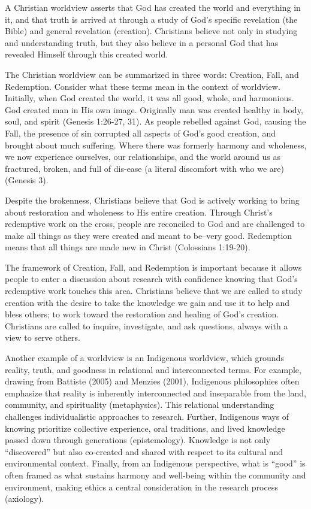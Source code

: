 \documentclass[
  letterpaper,
  DIV=11,
  numbers=noendperiod]{scrreprt}
\begin{document}
A Christian worldview asserts that God has created the world and
everything in it, and that truth is arrived at through a study of God's
specific revelation (the Bible) and general revelation (creation).
Christians believe not only in studying and understanding truth, but
they also believe in a personal God that has revealed Himself through
this created world.

The Christian worldview can be summarized in three words: Creation,
Fall, and Redemption. Consider what these terms mean in the context of
worldview. Initially, when God created the world, it was all good,
whole, and harmonious. God created man in His own image. Originally man
was created healthy in body, soul, and spirit (Genesis 1:26-27, 31). As
people rebelled against God, causing the Fall, the presence of sin
corrupted all aspects of God's good creation, and brought about much
suffering. Where there was formerly harmony and wholeness, we now
experience ourselves, our relationships, and the world around us as
fractured, broken, and full of dis-ease (a literal discomfort with who
we are) (Genesis 3).

Despite the brokenness, Christians believe that God is actively working
to bring about restoration and wholeness to His entire creation. Through
Christ's redemptive work on the cross, people are reconciled to God and
are challenged to make all things as they were created and meant to
be--very good. Redemption means that all things are made new in Christ
(Colossians 1:19-20).

The framework of Creation, Fall, and Redemption is important because it
allows people to enter a discussion about research with confidence
knowing that God's redemptive work touches this area. Christians believe
that we are called to study creation with the desire to take the
knowledge we gain and use it to help and bless others; to work toward
the restoration and healing of God's creation. Christians are called to
inquire, investigate, and ask questions, always with a view to serve
others.

Another example of a worldview is an Indigenous worldview, which grounds
reality, truth, and goodness in relational and interconnected terms. For
example, drawing from Battiste (2005) and Menzies (2001), Indigenous
philosophies often emphasize that reality is inherently interconnected
and inseparable from the land, community, and spirituality
(metaphysics). This relational understanding challenges individualistic
approaches to research. Further, Indigenous ways of knowing prioritize
collective experience, oral traditions, and lived knowledge passed down
through generations (epistemology). Knowledge is not only ``discovered''
but also co-created and shared with respect to its cultural and
environmental context. Finally, from an Indigenous perspective, what is
``good'' is often framed as what sustains harmony and well-being within
the community and environment, making ethics a central consideration in
the research process (axiology).
\end{document}

